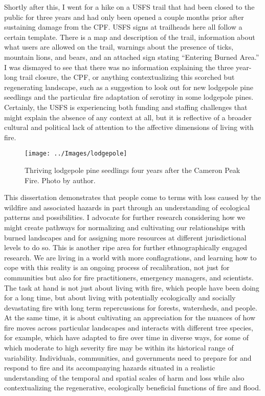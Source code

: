 \documentclass[
]{article}
\begin{document}
Shortly after this, I went for a hike on a USFS trail that had been closed to the public for three years and had only been opened a couple months prior after sustaining damage from the CPF. USFS signs at trailheads here all follow a certain template. There is a map and description of the trail, information about what users are allowed on the trail, warnings about the presence of ticks, mountain lions, and bears, and an attached sign stating ``Entering Burned Area.'' I was dismayed to see that there was no information explaining the three year-long trail closure, the CPF, or anything contextualizing this scorched but regenerating landscape, such as a suggestion to look out for new lodgepole pine seedlings and the particular fire adaptation of serotiny in some lodgepole pines. Certainly, the USFS is experiencing both funding and staffing challenges that might explain the absence of any context at all, but it is reflective of a broader cultural and political lack of attention to the affective dimensions of living with fire.

\begin{figure}
\texttt{[image: ../Images/lodgepole]} \caption[Lodgepole pine]{Thriving lodgepole pine seedlings four years after the Cameron Peak Fire. Photo by author.}\label{fig:figureTitle18}
\end{figure}

This dissertation demonstrates that people come to terms with loss caused by the wildfire and associated hazards in part through an understanding of ecological patterns and possibilities. I advocate for further research considering how we might create pathways for normalizing and cultivating our relationships with burned landscapes and for assigning more resources at different jurisdictional levels to do so. This is another ripe area for further ethnographically engaged research. We are living in a world with more conflagrations, and learning how to cope with this reality is an ongoing process of recalibration, not just for communities but also for fire practitioners, emergency managers, and scientists. The task at hand is not just about living with fire, which people have been doing for a long time, but about living with potentially ecologically and socially devastating fire with long term repercussions for forests, watersheds, and people. At the same time, it is about cultivating an appreciation for the nuances of how fire moves across particular landscapes and interacts with different tree species, for example, which have adapted to fire over time in diverse ways, for some of which moderate to high severity fire may be within its historical range of variability. Individuals, communities, and governments need to prepare for and respond to fire and its accompanying hazards situated in a realistic understanding of the temporal and spatial scales of harm and loss while also contextualizing the regenerative, ecologically beneficial functions of fire and flood.
\end{document}
